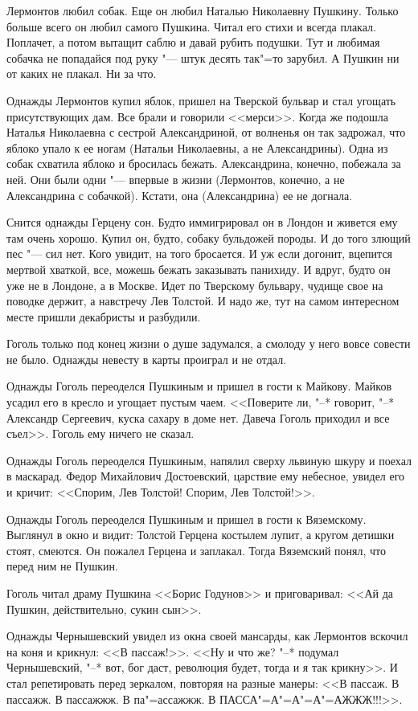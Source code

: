 Лермонтов любил собак. Еще он любил Наталью Николаевну Пушкину. Только больше 
всего он любил самого Пушкина. Читал его стихи и всегда плакал. Поплачет, а 
потом вытащит саблю и давай рубить подушки. Тут и любимая собачка не попадайся 
под руку "--- штук десять так"=то зарубил. А Пушкин ни от каких не плакал. Ни
за что.

Однажды Лермонтов купил яблок, пришел на Тверской бульвар и стал угощать 
присутствующих дам. Все брали и говорили <<мерси>>. Когда же подошла Наталья 
Николаевна с сестрой Александриной, от волненья он так задрожал, что яблоко 
упало к ее ногам (Натальи Николаевны, а не Александрины). Одна из собак схватила
яблоко и бросилась бежать. Александрина, конечно, побежала за ней. Они были одни
"--- впервые в жизни (Лермонтов, конечно, а не Александрина с собачкой). Кстати,
она (Александрина) ее не догнала.

Снится однажды Герцену сон. Будто иммигрировал он в Лондон и живется ему там 
очень хорошо. Купил он, будто, собаку бульдожей породы. И до того злющий
пес "--- сил нет. Кого увидит, на того бросается. И уж если догонит, вцепится 
мертвой хваткой, все, можешь бежать заказывать панихиду. И вдруг, будто он уже
не в Лондоне, а в Москве. Идет по Тверскому бульвару, чудище свое на поводке 
держит, а навстречу Лев Толстой. И надо же, тут на самом интересном месте пришли
декабристы и разбудили.

Гоголь только под конец жизни о душе задумался, а смолоду у него вовсе совести 
не было. Однажды невесту в карты проиграл и не отдал.

Однажды Гоголь переоделся Пушкиным и пришел в гости к Майкову. Майков усадил его
в кресло и угощает пустым чаем. <<Поверите ли, "--* говорит, "--* Александр 
Сергеевич, куска сахару в доме нет. Давеча Гоголь приходил и все съел>>. Гоголь 
ему ничего не сказал.

Однажды Гоголь переоделся Пушкиным, напялил сверху львиную шкуру и поехал в 
маскарад. Федор Михайлович Достоевский, царствие ему небесное, увидел его и 
кричит: <<Спорим, Лев Толстой! Спорим, Лев Толстой!>>.

Однажды Гоголь переоделся Пушкиным и пришел в гости к Вяземскому. Выглянул в 
окно и видит: Толстой Герцена костылем лупит, а кругом детишки стоят, смеются. 
Он пожалел Герцена и заплакал. Тогда Вяземский понял, что перед ним не Пушкин.

Гоголь читал драму Пушкина <<Борис Годунов>> и приговаривал: <<Ай да Пушкин, 
действительно, сукин сын>>.

Однажды Чернышевский увидел из окна своей мансарды, как Лермонтов вскочил на 
коня и крикнул: <<В пассаж!>>. <<Ну и что же? "--* подумал Чернышевский, "--* 
вот, бог даст, революция будет, тогда и я так крикну>>. И стал репетировать 
перед зеркалом, повторяя на разные манеры: <<В пассаж. В пассажж. В пассажжж. В 
па"=а­ссажжж. В ПАССА"=А"=А"=А"=АЖЖЖ!!!>>.